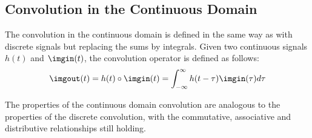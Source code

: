 \subsection{Convolution in the Continuous Domain}
%
%
The convolution in the continuous domain is defined in the same way as with discrete signals but replacing the sums by integrals. Given two continuous signals $h(t)$ and $\imgin(t)$, the convolution operator is defined as follows:
\begin{equation}
	\imgout(t) = h(t) \circ \imgin (t) = \int_{-\infty}^{\infty} h(t-\tau) \imgin (\tau) d\tau
\end{equation}

The properties of the continuous domain convolution are analogous to the properties of the discrete convolution, with the commutative, associative and distributive relationships still holding.

